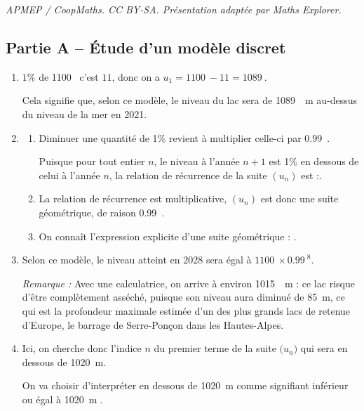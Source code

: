 \documentclass[10pt]{article}
\providecommand{\N}{\mathbb{N}}
\providecommand{\np}[2][]{{#2~#1}}
\begin{document}
\noindent\textit{APMEP / CoopMaths. CC BY-SA. Présentation adaptée par Maths Explorer.}\par\medskip
\subsection*{Partie A -- Étude d'un modèle discret}

	\begin{enumerate}
		\item $1\%$ de \np{1100} c'est $11$, donc on a {$u_1=\np{1100}-11=\np{1089}$.}

		Cela signifie que, selon ce modèle, le niveau du lac sera de \np[~m]{1089} au-dessus du niveau de la mer en 2021.

		\item
		\begin{enumerate}
			\item Diminuer une quantité de 1\% revient à multiplier celle-ci par \np{0.99}.

			Puisque pour tout entier $n$, le niveau à l'année $n+1$ est 1\% en dessous de celui à l'année $n$, la relation de récurrence de la suite {$(u_n)$} est :\quad {$\forall n \in \N, u_{n+1}=\np{0.99}u_n$}.

			\item La relation de récurrence est multiplicative, {$(u_n)$} est donc une suite géométrique, de raison \np{0.99}.

			\item On connaît l'expression explicite d'une suite géométrique :
			\quad {$\forall n \in \N, u_n=\np{1100}\times\np{0.99}^n$}.
		\end{enumerate}

		\item Selon ce modèle, le niveau atteint en 2028 sera égal à {$\np{1100}\times\np{0.99}^8$}.

		\emph{Remarque :} Avec une calculatrice, on arrive à environ \np[~m]{1015} : ce lac risque d'être complètement asséché, puisque son niveau aura diminué de 85~m, ce qui est la profondeur maximale estimée d'un des plus grands lacs de retenue d'Europe, le barrage de Serre-Ponçon dans les Hautes-Alpes.

		\item Ici, on cherche donc l'indice $n$ du premier terme de la suite $\big(u_n\big)$ qui sera \og en dessous de \np[m]{1020}\fg{}.

		On va choisir d'interpréter \og en dessous de \np[m]{1020}\fg{} comme signifiant \og inférieur ou égal à \np[m]{1020} \fg{}.


\end{enumerate}
\end{document}
